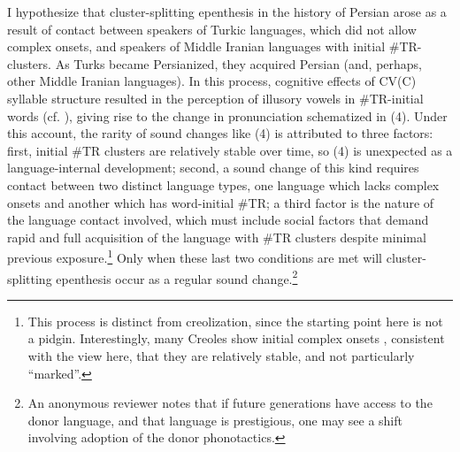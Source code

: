 \documentclass[output=paper,
modfonts
]{LSP/langsci}
\begin{document}
I hypothesize that cluster-splitting epenthesis in the history of
Persian arose as a result of contact between speakers of Turkic
languages, which did not allow complex onsets, and speakers of Middle
Iranian languages with initial \#TR-clusters. As Turks became
Persianized, they acquired Persian (and, perhaps, other Middle Iranian
languages). In this process, cognitive effects of CV(C) syllable
structure resulted in the perception of illusory vowels in \#TR-initial
words (cf. \citealt{dupoux1999a}), giving rise to the change in
pronunciation schematized in (4). Under this account, the rarity of
sound changes like (4) is attributed to three factors: first, initial
\#TR clusters are relatively stable over time, so (4) is unexpected as a
language-internal development; second, a sound change of this kind
requires contact between two distinct language types, one language which
lacks complex onsets and another which has word-initial \#TR; a third
factor is the nature of the language contact involved, which must
include social factors that demand rapid and full acquisition of the
language with \#TR clusters despite minimal previous exposure.\footnote{This
  process is distinct from creolization, since the starting point here
  is not a pidgin. Interestingly, many Creoles show initial complex
  onsets \citep{klein2013a}, consistent with the view here, that they are
  relatively stable, and not particularly ``marked''.} Only when these
last two conditions are met will cluster-splitting epenthesis occur as a
regular sound change.\footnote{An anonymous reviewer notes that if
  future generations have access to the donor language, and that
  language is prestigious, one may see a shift involving adoption of the
  donor phonotactics.}
\end{document}
